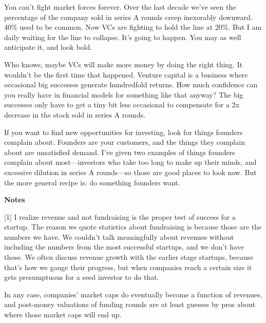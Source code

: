 You can't fight
                  market forces forever. Over the last decade we've seen the
                  percentage of the company sold in series A rounds creep
                  inexorably downward. 40\% used to be common. Now VCs are
                  fighting to hold the line at 20\%. But I am daily waiting for
                  the line to collapse. It's going to happen. You may as well
                  anticipate it, and look bold.

Who knows, maybe VCs
                  will make more money by doing the right thing. It wouldn't be
                  the first time that happened. Venture capital is a business
                  where occasional big successes generate hundredfold returns.
                  How much confidence can you really have in financial models
                  for something like that anyway? The big successes only have to
                  get a tiny bit less occasional to compensate for a 2x decrease
                  in the stock sold in series A rounds.

If you want
                  to find new opportunities for investing, look for things
                  founders complain about. Founders are your customers, and the
                  things they complain about are unsatisfied demand. I've given
                  two examples of things founders complain about
                  most---investors who take too long to make up their minds,
                  and excessive dilution in series A rounds---so those are
                  good places to look now. But the more general recipe is: do
                  something founders want.






                  \textbf{Notes}

[1] I realize revenue and not fundraising is the proper test of
                  success for a startup. The reason we quote statistics about
                  fundraising is because those are the numbers we have. We
                  couldn't talk meaningfully about revenues without including
                  the numbers from the most successful startups, and we don't
                  have those. We often discuss revenue growth with the earlier
                  stage startups, because that's how we gauge their progress,
                  but when companies reach a certain size it gets presumptuous
                  for a seed investor to do that.

In any case,
                  companies' market caps do eventually become a function of
                  revenues, and post-money valuations of funding rounds are at
                  least guesses by pros about where those market caps will end
                  up.

